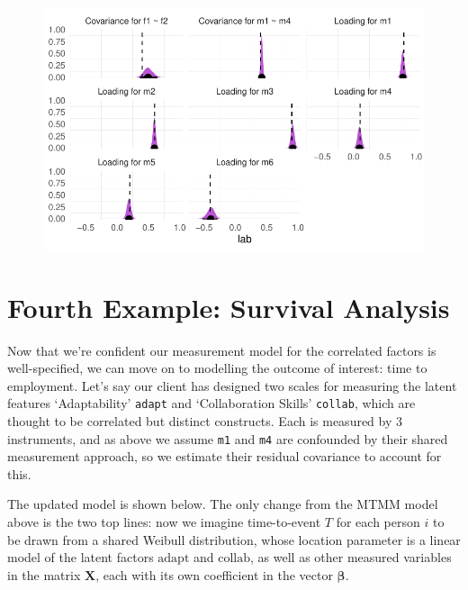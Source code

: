 \documentclass[
  letterpaper,
  DIV=11,
  numbers=noendperiod]{scrreprt}
\begin{document}
\begin{figure}[H]

{\centering \includegraphics{./bayesian-cfa_files/figure-pdf/unnamed-chunk-17-1.pdf}

}

\end{figure}

\hypertarget{fourth-example-survival-analysis}{%
\section{Fourth Example: Survival
Analysis}\label{fourth-example-survival-analysis}}

Now that we're confident our measurement model for the correlated
factors is well-specified, we can move on to modelling the outcome of
interest: time to employment. Let's say our client has designed two
scales for measuring the latent features `Adaptability' \texttt{adapt}
and `Collaboration Skills' \texttt{collab}, which are thought to be
correlated but distinct constructs. Each is measured by 3 instruments,
and as above we assume \texttt{m1} and \texttt{m4} are confounded by
their shared measurement approach, so we estimate their residual
covariance to account for this.

The updated model is shown below. The only change from the MTMM model
above is the two top lines: now we imagine time-to-event \(T\) for each
person \(i\) to be drawn from a shared Weibull distribution, whose
location parameter is a linear model of the latent factors
\(\text{adapt}\) and \(\text{collab}\), as well as other measured
variables in the matrix \(\mathbf{X}\), each with its own coefficient in
the vector \(\boldsymbol{\beta}\).
\end{document}
